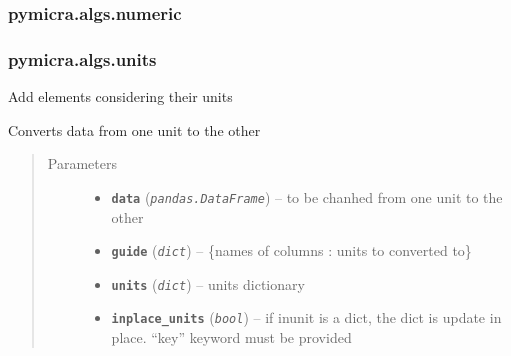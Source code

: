 \documentclass[a4paper,10pt,oneside]{sphinxmanual}
\begin{document}
\subsubsection{pymicra.algs.numeric}
\label{pymicra.algs:module-pymicra.algs.numeric}\label{pymicra.algs:pymicra-algs-numeric}

\subsubsection{pymicra.algs.units}
\label{pymicra.algs:pymicra-algs-units}\label{pymicra.algs:module-pymicra.algs.units}

\begin{fulllineitems}
\label{pymicra.algs:pymicra.algs.units.add}
Add elements considering their units

\end{fulllineitems}


\begin{fulllineitems}
\label{pymicra.algs:pymicra.algs.units.convert_cols}
Converts data from one unit to the other
\begin{quote}\begin{description}
\item[{Parameters}] \leavevmode\begin{itemize}
\item {} 
\textbf{\texttt{data}} (\emph{\texttt{pandas.DataFrame}}) -- to be chanhed from one unit to the other

\item {} 
\textbf{\texttt{guide}} (\emph{\texttt{dict}}) -- \{names of columns : units to converted to\}

\item {} 
\textbf{\texttt{units}} (\emph{\texttt{dict}}) -- units dictionary

\item {} 
\textbf{\texttt{inplace\_units}} (\emph{\texttt{bool}}) -- if inunit is a dict, the dict is update in place. ``key'' keyword must be provided

\end{itemize}

\end{description}\end{quote}

\end{fulllineitems}
\end{document}
